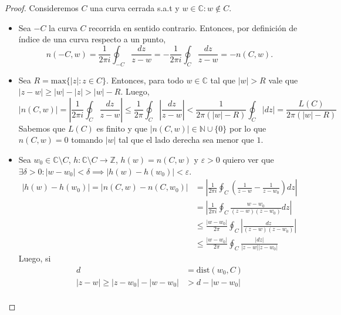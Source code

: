 \documentclass{article}
\newcommand{\Z}{\mathbb{Z}}
\newcommand{\N}{\mathbb{N}}
\newcommand{\C}{\mathbb{C}}
\newcommand{\eps}{\varepsilon}
\begin{document}
\begin{proof}
    Consideremos \( C \) una curva cerrada s.a.t y \( w \in \C : w \notin C \).\begin{itemize}
        \item Sea \( -C \) la curva \( C \) recorrida en sentido contrario. Entonces, por definición de índice de una curva respecto a un punto,
              \[
                  n(-C, w) = \frac{1}{2\pi i} \oint_{-C} \frac{dz}{z - w} = -\frac{1}{2\pi i} \oint_{C} \frac{dz}{z - w} = -n(C, w).
              \]
        \item Sea \( R = \text{max} \{ |z| : z \in C \} \). Entonces, para todo \( w \in \C \) tal que \( |w| > R \) vale que \( |z-w| \geq |w| - |z| > |w| - R \). Luego,
              \[
                  |n(C, w)| = \left| \frac{1}{2\pi i} \oint_{C} \frac{dz}{z-w} \right| \leq \frac{1}{2\pi} \oint_{C} \left| \frac{dz}{z-w} \right| < \frac{1}{2\pi (|w| - R)} \oint_{C} |dz| = \frac{L(C)}{2\pi (|w| - R)}
              \]
              Sabemos que \( L(C) \) es finito y que \( |n(C, w)| \in \N \cup \{ 0 \} \) por lo que \( n(C, w) = 0 \) tomando \( |w| \) tal que el lado derecha sea menor que \( 1 \).
        \item Sea \( w_0 \in \C \setminus C \), \( h : \C \setminus C \to \Z \), \( h(w) = n(C, w) \) y \( \eps > 0 \) quiero ver que \( \exists \delta > 0 : |w - w_0| < \delta \implies |h(w) - h(w_0)| < \eps \).\begin{align*}
                  |h(w) - h(w_0)| = |n(C, w) - n(C, w_0)| & = \left| \frac{1}{2\pi i} \oint_{C} \left( \frac{1}{z - w} - \frac{1}{z - w_0} \right) dz \right| \\
                                                          & = \left| \frac{1}{2\pi i} \oint_{C} \frac{w - w_0}{(z - w)(z - w_0)} dz \right|                   \\
                                                          & \leq \frac{|w - w_0|}{2\pi} \oint_{C} \left| \frac{dz}{(z - w)(z - w_0)} \right|                  \\
                                                          & \leq \frac{|w - w_0|}{2\pi} \oint_{C} \frac{|dz|}{|z - w||z - w_0|}
              \end{align*}
              Luego, si \begin{align*}
                  d                              & = \text{dist}(w_0, C) \\
                  |z-w| \geq |z-w_0| - |w - w_0| & > d - |w - w_0|       \\

\end{align*}
\end{itemize}
\end{proof}
\end{document}
